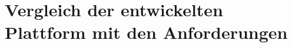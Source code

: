 \label{sec:bewertung-vergleich-anforderungen}
\section{Vergleich der entwickelten Plattform mit den Anforderungen}